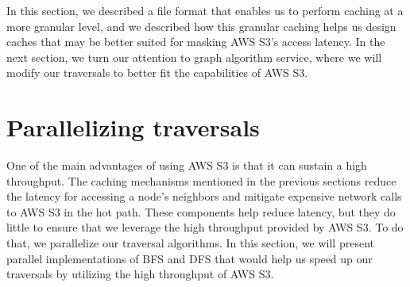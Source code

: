 \bigskip
In this section, we described a file format that enables us to perform caching
at a more granular level, and we described how this granular caching helps us
design caches that may be better suited for masking AWS S3's access latency.
In the next section, we turn our
attention to graph algorithm service, where we will modify our traversals to
better fit the capabilities of AWS S3.


\section{Parallelizing traversals}\label{sec:parallelAlgorithms}
One of the main advantages of using AWS S3 is that it can sustain a
high throughput. The caching mechanisms mentioned in the previous sections
reduce the latency for accessing a node's neighbors and mitigate expensive
network calls to AWS S3 in the hot path. These components help reduce
latency, but they do little to ensure that we leverage the
high throughput provided by AWS S3. To do that, we parallelize our
traversal algorithms. In this section, we will present parallel implementations
of BFS and DFS that would help us speed up our traversals by utilizing the
high throughput of AWS S3.

